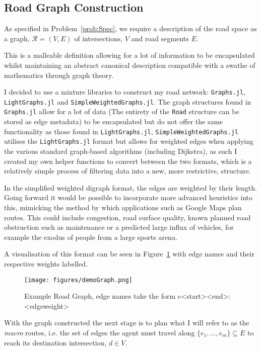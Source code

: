 \subsection{Road Graph Construction }

As specified in Problem~\ref{prob:Spec}, we require a description of the road space as a graph, $\mathcal{R}= (V,E)$ of intersections, $V$ and road segments $E$.

This is a malleable definition allowing for a lot of information to be encapsulated whilst maintaining an abstract canonical description compatible with a swathe of mathematics through graph theory.

I decided to use a mixture libraries to construct my road network: \texttt{Graphs.jl}\cite{JuliaAtticGraphsJl2021}, \texttt{LightGraphs.jl}\cite{Bromberger17}  and \texttt{SimpleWeightedGraphs.jl}\cite{JuliaGraphsSimpleWeightedGraphsJl2021}. The graph structures found in \texttt{Graphs.jl} allow for a lot of data (The entirety of the \texttt{Road} structure can be stored as edge metadata) to be encapsulated but do not offer the same functionality as those found in \texttt{LightGraphs.jl}, \texttt{SimpleWeightedGraphs.jl} utilises the \texttt{LightGraphs.jl} format but allows for weighted edges when applying the various standard graph-based algorithms (including Dijkstra), as such I created my own helper functions to convert between the two formats, which is a relatively simple process of filtering data into a new, more restrictive, structure.

In the simplified weighted digraph format, the edges are weighted by their length. Going forward it would be possible to incorporate more advanced heuristics into this, mimicking the method by which applications such as Google Maps plan routes. This could include congestion, road surface quality, known planned road obstruction such as maintenance or a predicted large influx of vehicles, for example the exodus of people from a large sports arena.

A visualisation of this format can be seen in Figure~\ref{fig:demoGraph} with edge names and their respective weights labelled.


\begin{figure}[ht]
  \centering
  \texttt{[image: figures/demoGraph.png]}
  \caption{\label{fig:demoGraph} Example Road Graph, edge names take the form $e$<start><end>: <edgeweight> }
\end{figure}


With the graph constructed the next stage is to plan what I will refer to as the \textit{macro} routes, i.e. the set of edges the agent must travel along $\{e_{1},\ldots,e_{m}\} \subseteq E$ to reach its destination intersection, $d \in V$.

